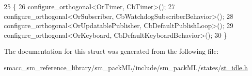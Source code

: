 \begin{DoxyCode}
25     \{
26         configure\_orthogonal<OrTimer, CbTimer>();   
27         configure\_orthogonal<OrSubscriber, CbWatchdogSubscriberBehavior>();
28         configure\_orthogonal<OrUpdatablePublisher, CbDefaultPublishLoop>();
29         configure\_orthogonal<OrKeyboard, CbDefaultKeyboardBehavior>();
30     \}
\end{DoxyCode}


The documentation for this struct was generated from the following file\+:\begin{DoxyCompactItemize}
\item 
smacc\+\_\+sm\+\_\+reference\+\_\+library/sm\+\_\+pack\+M\+L/include/sm\+\_\+pack\+M\+L/states/\hyperlink{st__idle_8h}{st\+\_\+idle.\+h}\end{DoxyCompactItemize}
